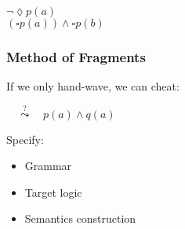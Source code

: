\begin{frame}
{        \begin{minipage}[t][2cm]{0.6\textwidth}\vspace{1em}
            \\[0.5em]
        \end{minipage}\hfill
        \begin{minipage}[t][2cm]{0.39\textwidth}\vspace{1em}
            $\neg\lozenge p(a)$\\[0.5em]
            $(\square p(a)) \wedge \square p(b)$
        \end{minipage}
    }
\end{frame}

\begin{frame}
    \frametitle{Method of Fragments}
    If we only hand-wave, we can cheat:

    \hspace{2em}
    $\quad\stackrel{?}{\leadsto}\quad p(a)\wedge q(a)$

    \vspace{1.5em}
    Specify:
    \begin{itemize}
        \item Grammar
        \item Target logic
        \item Semantics construction
    \end{itemize}
\end{frame}
